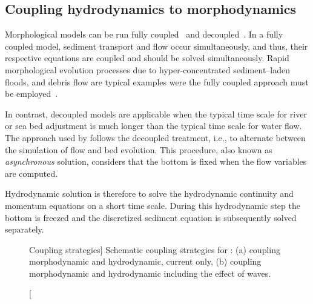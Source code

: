 \subsection{Coupling hydrodynamics to morphodynamics}
Morphological models can be run fully coupled~\cite{cao02} and decoupled~\cite{vriend87}. In a fully coupled model, sediment
transport and flow occur simultaneously, and thus, their respective
equations are coupled and should be solved simultaneously. Rapid morphological evolution processes due
to hyper-concentrated sediment--laden floods, and debris flow are typical
examples were the fully coupled approach must be employed~\cite{Frac02}.

In contrast, decoupled models are applicable when the typical time scale for river or sea bed adjustment 
is much longer than the typical time scale for water flow. The approach used by \sisyphe{} follows the decoupled treatment, i.e., to alternate between the simulation of flow and bed evolution. This procedure, also known as \textit{asynchronous} solution, considers that the bottom is fixed when the flow variables are computed.

Hydrodynamic solution is therefore to solve the hydrodynamic continuity and momentum equations on a short time scale. 
During this hydrodynamic step the bottom is freezed and the discretized sediment equation is subsequently solved separately.


\begin{figure}[H]%
\begin{center}
%
\hfil
%
%
\hfil
%
%
\hfil
\mbox{}
\end{center}
\caption
[Coupling strategies]
{Schematic coupling strategies for \sisyphe: (a) coupling morphodynamic and hydrodynamic, current only, (b) coupling morphodynamic and hydrodynamic including the effect of waves.}
\label{fig:CouplingStrategies}
\end{figure}

\pagebreak

